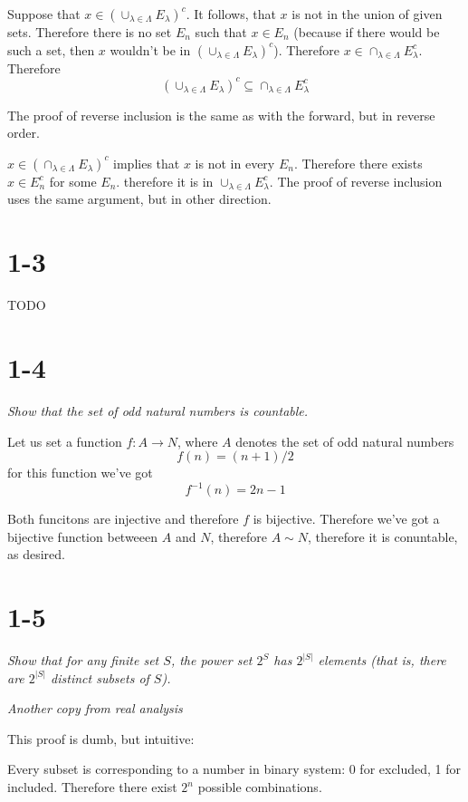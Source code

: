 \documentclass[11pt,oneside,titlepage]{book}
\begin{document}
Suppose that $x \in \left(\cup_{\lambda \in \Lambda} E_\lambda \right)^c$. It
follows, that $x$ is not in the union of given sets. Therefore there is no
set $E_n$ such that $x \in E_n$ (because if there would be such a set, then $x$
wouldn't be in $\left(\cup_{\lambda \in \Lambda} E_\lambda \right)^c$).
Therefore $x \in \cap_{\lambda \in \Lambda} E_\lambda^c$. Therefore 
$$\left(\cup_{\lambda \in \Lambda} E_\lambda \right)^c \subseteq
\cap_{\lambda \in \Lambda} E_\lambda^c$$

The proof of reverse inclusion is the same as with the forward, but in reverse
order.

$x \in \left(\cap_{\lambda \in \Lambda} E_\lambda \right)^c$ implies that
$x$ is not in every $E_n$. Therefore there exists $x \in E_n^c$ for some $E_n$.
therefore it is in $\cup_{\lambda \in \Lambda} E_\lambda^c$. The proof of
reverse inclusion uses the same argument, but in other direction.

\section*{1-3}
TODO

\section*{1-4}
\textit{Show that the set of odd natural numbers is countable.}

Let us set a function $f: A \to N$, where $A$ denotes the set of
odd natural numbers
$$f(n) = (n + 1) / 2$$
for this function  we've got
$$f^{-1}(n) = 2n - 1$$

Both funcitons are injective and therefore $f$ is bijective. Therefore
we've got a bijective function betweeen $A$ and $N$, therefore
$A \sim N$, therefore it is conuntable, as desired.

\section*{1-5}
\textit{Show that for any finite set $S$, the power set $2^S$ has
  $2^{|S|}$ elements (that is, there are $2^{|S|}$ distinct subsets of $S$).}

\textit{Another copy from real analysis}

This proof is dumb, but intuitive:

Every subset is corresponding to a number in binary system: 0 for excluded,
1 for included. Therefore there exist $2^n$ possible combinations.
\end{document}
